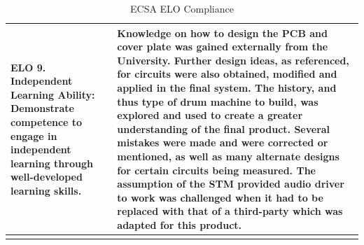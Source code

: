 \documentclass[12pt,a4paper]{report}
\begin{document}
\begin{longtable}[c]{|m{}|m{}|}
	\hline
	\textbf{ELO 9. Independent Learning Ability:} \newline Demonstrate competence to engage in independent learning through well-developed learning skills. & Knowledge on how to design the PCB and cover plate was gained externally from the University. Further design ideas, as referenced, for circuits were also obtained, modified and applied in the final system. The history, and thus type of drum machine to build, was explored and used to create a greater understanding of the final product. Several mistakes were made and were corrected or mentioned, as well as many alternate designs for certain circuits being measured. The assumption of the STM provided audio driver to work was challenged when it had to be replaced with that of a third-party which was adapted for this product. \\
	\hline
	
	\caption{ECSA ELO Compliance}
	\label{tab:ecsa}%
\end{longtable}%
	
\end{document}

